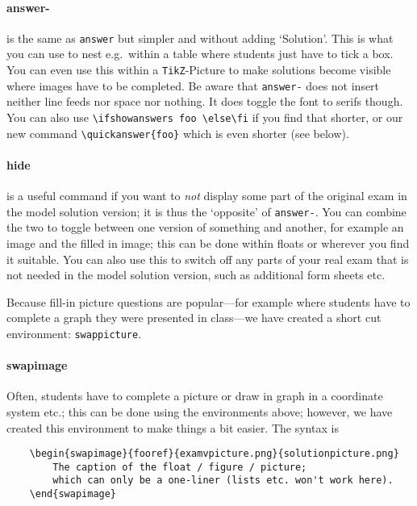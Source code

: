 \documentclass[a4paper]{scrartcl}
\begin{document}
\paragraph{answer-}

is the same as \verb|answer| but simpler and without adding `Solution'. This is what you can use to nest e.g.\ within a table where students just have to tick a box. You can even use this within a \verb|TikZ|-Picture to make solutions become visible where images have to be completed. Be aware that \verb|answer-| does not insert neither line feeds nor space nor nothing. It does toggle the font to serifs though.  You can also use \verb|\ifshowanswers foo \else\fi| if you find that shorter, or our new command \verb|\quickanswer{foo}| which is even shorter (see below).



\paragraph{hide}

is a useful command if you want to \emph{not} display some part of the original exam in the model solution version; it is thus the `opposite' of  \verb|answer-|.  You can combine the two to toggle between one version of something and another, for example an image and the filled in image; this can be done within floats or wherever you find it suitable. You can also use this to switch off any parts of your real exam that is not needed in the model solution version, such as additional form sheets etc. 

Because fill-in picture questions are popular---for example where students have to complete a graph they were presented in class---we have created a short cut environment: \verb|swappicture|.

\paragraph{swapimage}

Often, students have to complete a picture or draw in graph in a coordinate system etc.; this can be done using the environments above; however, we have created this environment to make things a bit easier. The syntax is

\begin{verbatim}
    \begin{swapimage}{fooref}{examvpicture.png}{solutionpicture.png}
        The caption of the float / figure / picture;
        which can only be a one-liner (lists etc. won't work here).
    \end{swapimage}
\end{verbatim}
\end{document}
